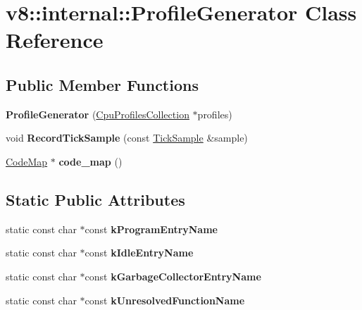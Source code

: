 \hypertarget{classv8_1_1internal_1_1_profile_generator}{}\section{v8\+:\+:internal\+:\+:Profile\+Generator Class Reference}
\label{classv8_1_1internal_1_1_profile_generator}
\subsection*{Public Member Functions}
\begin{DoxyCompactItemize}
\item 
\hypertarget{classv8_1_1internal_1_1_profile_generator_a538d180f766813125ded7ce7d5e69693}{}{\bfseries Profile\+Generator} (\hyperlink{classv8_1_1internal_1_1_cpu_profiles_collection}{Cpu\+Profiles\+Collection} $\ast$profiles)\label{classv8_1_1internal_1_1_profile_generator_a538d180f766813125ded7ce7d5e69693}

\item 
\hypertarget{classv8_1_1internal_1_1_profile_generator_a321d0ff6232f550c83d0ffc43da9f599}{}void {\bfseries Record\+Tick\+Sample} (const \hyperlink{structv8_1_1internal_1_1_tick_sample}{Tick\+Sample} \&sample)\label{classv8_1_1internal_1_1_profile_generator_a321d0ff6232f550c83d0ffc43da9f599}

\item 
\hypertarget{classv8_1_1internal_1_1_profile_generator_a8e7b039f4a0e933edd362264a5c0dd6a}{}\hyperlink{classv8_1_1internal_1_1_code_map}{Code\+Map} $\ast$ {\bfseries code\+\_\+map} ()\label{classv8_1_1internal_1_1_profile_generator_a8e7b039f4a0e933edd362264a5c0dd6a}

\end{DoxyCompactItemize}
\subsection*{Static Public Attributes}
\begin{DoxyCompactItemize}
\item 
static const char $\ast$const {\bfseries k\+Program\+Entry\+Name}
\item 
static const char $\ast$const {\bfseries k\+Idle\+Entry\+Name}
\item 
static const char $\ast$const {\bfseries k\+Garbage\+Collector\+Entry\+Name}
\item 
static const char $\ast$const {\bfseries k\+Unresolved\+Function\+Name}
\end{DoxyCompactItemize}


